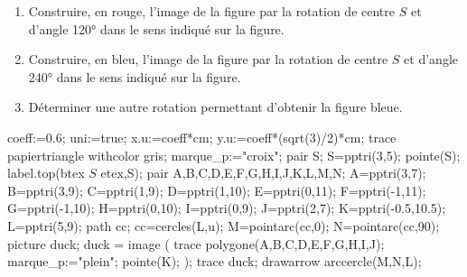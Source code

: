 \begin{exercice*}
    \begin{enumerate}
        \item Construire, en rouge, l'image de la figure par la rotation de centre $S$ et d'angle \ang{120} dans le sens indiqué sur la figure.
        \item Construire, en bleu, l'image de la figure par la rotation de centre $S$ et d'angle \ang{240} dans le sens indiqué sur la figure.
        \item Déterminer une autre rotation permettant d'obtenir la figure bleue.
    \end{enumerate}
    \begin{Geometrie}[CoinHD={(7u,6u)}]
        coeff:=0.6;
        uni:=true;
        x.u:=coeff*cm;
        y.u:=coeff*(sqrt(3)/2)*cm;
        trace papiertriangle withcolor gris;
        marque_p:="croix";
        pair S;
        S=pptri(3,5);    
        pointe(S);
        label.top(btex $S$ etex,S);
        pair A,B,C,D,E,F,G,H,I,J,K,L,M,N;
        A=pptri(3,7);
        B=pptri(3,9);
        C=pptri(1,9);
        D=pptri(1,10);
        E=pptri(0,11);
        F=pptri(-1,11);
        G=pptri(-1,10);
        H=pptri(0,10);
        I=pptri(0,9);
        J=pptri(2,7);
        K=pptri(-0.5,10.5);
        L=pptri(5,9);
        path cc;
        cc=cercles(L,u);
        M=pointarc(cc,0);
        N=pointarc(cc,90);
        picture duck;
        duck = image ( 
            trace polygone(A,B,C,D,E,F,G,H,I,J);         
            marque_p:="plein";
            pointe(K);
        );
        trace duck;
        drawarrow arccercle(M,N,L);     
    \end{Geometrie}
\end{exercice*}
